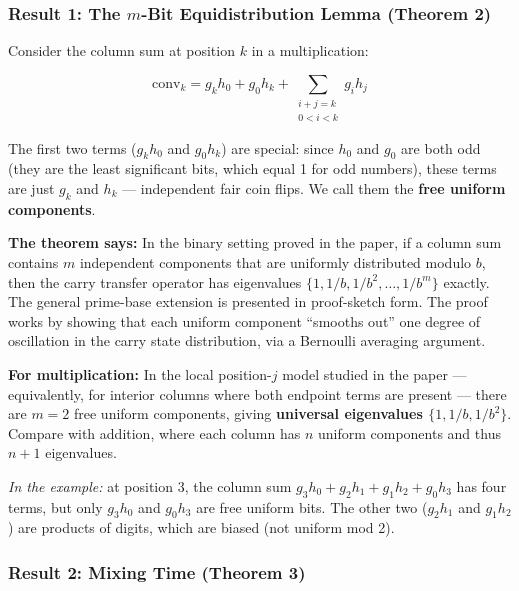 \documentclass[
  11pt,
]{article}
\begin{document}
\subsubsection{\texorpdfstring{Result 1: The \(m\)-Bit Equidistribution Lemma
(Theorem
2)}{Result 1: The m-Bit Equidistribution Lemma (Theorem 2)}}\label{result-1-the-m-bit-equidistribution-lemma-theorem-2}

Consider the column sum at position \(k\) in a multiplication:

\[\text{conv}_k = g_k h_0 + g_0 h_k + \sum_{\substack{i+j=k \\ 0 < i < k}} g_i h_j\]

The first two terms (\(g_k h_0\) and \(g_0 h_k\)) are special: since \(h_0\) and
\(g_0\) are both odd (they are the least significant bits, which equal 1 for odd
numbers), these terms are just \(g_k\) and \(h_k\) --- independent fair coin
flips. We call them the \textbf{free uniform components}.

\textbf{The theorem says:} In the binary setting proved in the paper, if a
column sum contains \(m\) independent components that are uniformly distributed
modulo \(b\), then the carry transfer operator has eigenvalues
\(\lbrace{}1, 1/b, 1/b^2, \ldots, 1/b^m\rbrace{}\) exactly. The general
prime-base extension is presented in proof-sketch form. The proof works by
showing that each uniform component ``smooths out'' one degree of oscillation in
the carry state distribution, via a Bernoulli averaging argument.

\textbf{For multiplication:} In the local position-\(j\) model studied in the
paper --- equivalently, for interior columns where both endpoint terms are
present --- there are \(m = 2\) free uniform components, giving
\textbf{universal eigenvalues \(\lbrace{}1, 1/b, 1/b^2\rbrace{}\)}. Compare with
addition, where each column has \(n\) uniform components and thus \(n+1\)
eigenvalues.

\emph{In the example:} at position 3, the column sum
\(g_3 h_0 + g_2 h_1 + g_1 h_2 + g_0 h_3\) has four terms, but only \(g_3 h_0\)
and \(g_0 h_3\) are free uniform bits. The other two (\(g_2 h_1\) and
\(g_1 h_2\)) are products of digits, which are biased (not uniform mod 2).

\subsubsection{Result 2: Mixing Time (Theorem
3)}\label{result-2-mixing-time-theorem-3}
\end{document}

